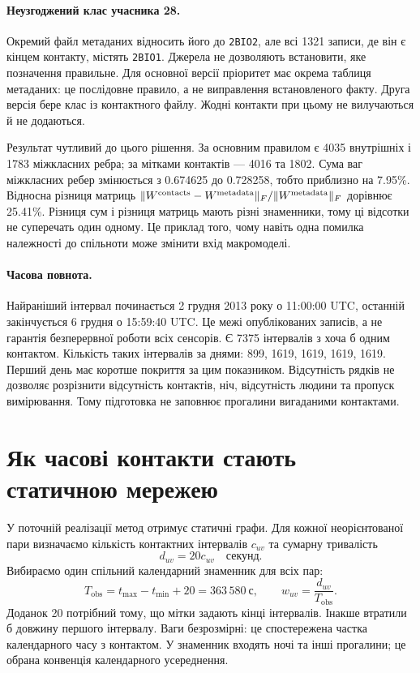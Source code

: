 \documentclass[11pt,a4paper]{article}
\begin{document}
\paragraph{Неузгоджений клас учасника 28.}
Окремий файл метаданих відносить його до \texttt{2BIO2}, але всі 1321 записи, де він є кінцем контакту, містять \texttt{2BIO1}. Джерела не дозволяють встановити, яке позначення правильне. Для основної версії пріоритет має окрема таблиця метаданих: це послідовне правило, а не виправлення встановленого факту. Друга версія бере клас із контактного файлу. Жодні контакти при цьому не вилучаються й не додаються.

Результат чутливий до цього рішення. За основним правилом є 4035 внутрішніх і 1783 міжкласних ребра; за мітками контактів --- 4016 та 1802. Сума ваг міжкласних ребер змінюється з 0.674625 до 0.728258, тобто приблизно на 7.95\%. Відносна різниця матриць $\|W^{\rm contacts}-W^{\rm metadata}\|_F/\|W^{\rm metadata}\|_F$ дорівнює 25.41\%. Різниця сум і різниця матриць мають різні знаменники, тому ці відсотки не суперечать один одному. Це приклад того, чому навіть одна помилка належності до спільноти може змінити вхід макромоделі.

\paragraph{Часова повнота.}
Найраніший інтервал починається 2 грудня 2013 року о 11:00:00 UTC, останній закінчується 6 грудня о 15:59:40 UTC. Це межі опублікованих записів, а не гарантія безперервної роботи всіх сенсорів. Є 7375 інтервалів з хоча б одним контактом. Кількість таких інтервалів за днями: 899, 1619, 1619, 1619, 1619. Перший день має коротше покриття за цим показником. Відсутність рядків не дозволяє розрізнити відсутність контактів, ніч, відсутність людини та пропуск вимірювання. Тому підготовка не заповнює прогалини вигаданими контактами.

\section{Як часові контакти стають статичною мережею}
У поточній реалізації метод отримує статичні графи. Для кожної неорієнтованої пари визначаємо кількість контактних інтервалів $c_{uv}$ та сумарну тривалість
\[
d_{uv}=20c_{uv}\quad\text{секунд}.
\]
Вибираємо один спільний календарний знаменник для всіх пар:
\[
T_{\mathrm{obs}}=t_{\max}-t_{\min}+20=363\,580\ \text{с},\qquad
w_{uv}=\frac{d_{uv}}{T_{\mathrm{obs}}}.
\]
Доданок 20 потрібний тому, що мітки задають кінці інтервалів. Інакше втратили б довжину першого інтервалу. Ваги безрозмірні: це спостережена частка календарного часу з контактом. У знаменник входять ночі та інші прогалини; це обрана конвенція календарного усереднення.
\end{document}
